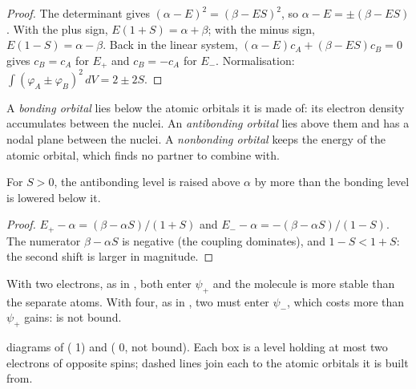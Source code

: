 \begin{proof}
The determinant gives $(\alpha - E)^2 = (\beta - ES)^2$, so $\alpha - E = \pm(\beta - ES)$.
With the plus sign, $E(1 + S) = \alpha + \beta$; with the minus sign, $E(1 - S) = \alpha
- \beta$. Back in the linear system, $(\alpha - E)c_A + (\beta - ES)c_B = 0$ gives $c_B
= c_A$ for $E_+$ and $c_B = -c_A$ for $E_-$. Normalisation: $\int(\varphi_A \pm
\varphi_B)^2\,dV = 2 \pm 2S$.
\end{proof}

\begin{definition}\label{def:b2:diatomic-mos:bonding}
A \emph{bonding orbital} lies below the atomic orbitals it
is made of: its electron density accumulates between the nuclei. An
\emph{antibonding orbital} lies above them and has a
nodal plane between the nuclei. A \emph{nonbonding orbital}
keeps the energy of the atomic orbital, which finds no partner to
combine with.
\end{definition}

\begin{proposition}\label{prop:b2:diatomic-mos:asymmetry}
For $S > 0$, the antibonding level is raised above $\alpha$ by more than the
bonding level is lowered below it.
\end{proposition}

\begin{proof}
$E_+ - \alpha = (\beta - \alpha S)/(1 + S)$ and $E_- - \alpha = -(\beta - \alpha S)/(1 - S)$.
The numerator $\beta - \alpha S$ is negative (the coupling dominates), and $1 - S < 1
+ S$: the second shift is larger in magnitude.
\end{proof}

With two electrons, as in , both enter $\psi_+$ and the molecule is more
stable than the separate atoms. With four, as in , two must enter $\psi_-$,
which costs more than $\psi_+$ gains:  is not bound.

\begin{omfigure}
\begin{MOdiagram}
\end{MOdiagram}
\hspace{1.5cm}
\begin{MOdiagram}
\end{MOdiagram}

{\small {} diagrams of  ( 1) and  ( 0, not bound). Each box is a level holding at most two electrons of
opposite spins; dashed lines join each  to the atomic orbitals
it is built from.}
\end{omfigure}

